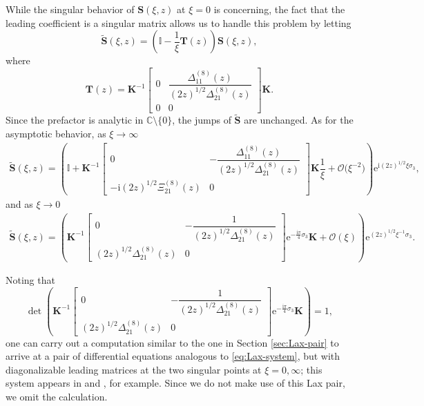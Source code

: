 \documentclass[11pt]{article}
\numberwithin{equation}{section}
\numberwithin{equation}{section}
\newcommand{\ee}{\mathrm{e}}
\newcommand{\ii}{\mathrm{i}}
\newcommand{\C}{{\mathbb{C}}}
\begin{document}
While the singular behavior of $\mathbf{S}(\xi, z)$ at $\xi = 0$ is concerning, the fact that the leading coefficient is a singular matrix allows us to handle this problem by letting
\begin{equation}\label{eq:triangular-transformation}
\widetilde{\mathbf{S}}(\xi, z) = \left( \mathbb{I} -\dfrac{1}{\xi} \mathbf{T}(z) \right) \mathbf{S}(\xi, z),
\end{equation}
where
\begin{equation}
\mathbf{T}(z) = \mathbf{K}^{-1}\begin{bmatrix} 0 & \dfrac{\Delta^{(8)}_{11}(z)}{(2z)^{1/2}\Delta^{(8)}_{21}(z)} \\ 0 & 0\end{bmatrix}\mathbf{K}.
\label{eq:L-def}
\end{equation}
Since the prefactor is analytic in $\C \setminus \{0\}$, the jumps of $\widetilde{\mathbf{S}}$ are unchanged. As for the asymptotic behavior, as $\xi\to\infty$
\begin{align*}
\widetilde{\mathbf S}(\xi, z) = \left( \mathbb{I} + \mathbf K^{-1} \begin{bmatrix}
 0 & -\dfrac{\Delta^{(8)}_{11}(z)}{(2z)^{1/2}\Delta^{(8)}_{21}(z)} \\ -\ii(2z)^{1/2} \Xi^{(8)}_{21}(z) & 0
\end{bmatrix} \mathbf K \dfrac{1}{\xi}+ \mathcal{O}\big(\xi^{-2}\big) \right)\ee^{\ii (2z)^{1/2} \xi \sigma_3},
\end{align*}
and as $\xi\to 0$
\begin{align*}
\widetilde{\mathbf S}(\xi, z) = \left( \mathbf{K}^{-1}\begin{bmatrix} 0 & -\dfrac{1}{(2z)^{1/2}\Delta^{(8)}_{21}(z)} \\ (2z)^{1/2}\Delta^{(8)}_{21}(z) & 0\end{bmatrix} \ee^{-\frac{\ii\pi}{4}\sigma_3}\mathbf{K} + \mathcal{O}(\xi) \right)\ee^{{ (2z)^{1/2}}{ \xi^{-1}} \sigma_3}.
\end{align*}
\begin{Remark}
Noting that
\[
\det \left( \mathbf{K}^{-1}\begin{bmatrix} 0 & -\dfrac{1}{(2z)^{1/2}\Delta^{(8)}_{21}(z)} \\ (2z)^{1/2}\Delta^{(8)}_{21}(z) & 0\end{bmatrix} \ee^{-\frac{\ii\pi}{4}\sigma_3}\mathbf{K} \right) = 1,
\]
one can carry out a computation similar to the one in Section \ref{sec:Lax-pair} to arrive at a pair of differential equations analogous to \eqref{eq:Lax-system}, but with diagonalizable leading matrices at the two singular points at $\xi = 0, \infty$; this system appears in \cite[Chapter 2]{N} and \cite{GL}, for example. Since we do not make use of this Lax pair, we omit the calculation.
\end{Remark}
\end{document}
